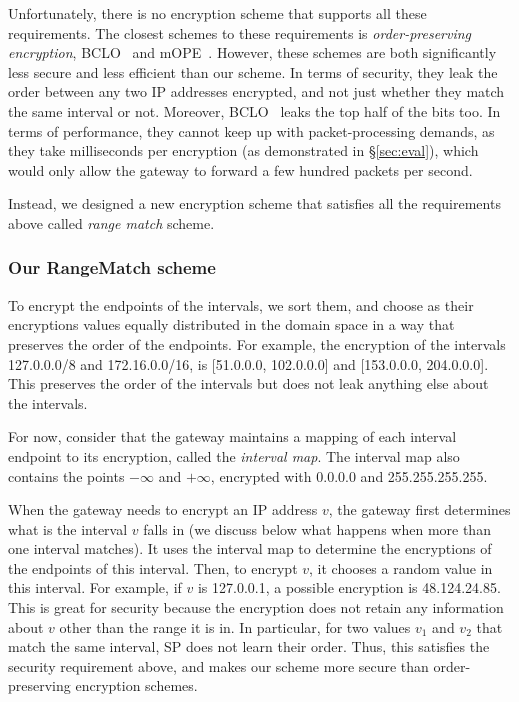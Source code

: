Unfortunately, there is no encryption scheme that supports all these requirements. The closest schemes to these requirements  is {\em order-preserving encryption}, BCLO~\cite{boldyreva:ope} and mOPE~\cite{popa:mope}. However, these schemes are both significantly less secure and less efficient than our scheme. In terms of security, they leak the order between any two IP addresses encrypted, and not just whether they match the same interval or not. Moreover, BCLO~\cite{boldyreva:ope} leaks the top half of the bits too. In terms of performance, they cannot keep up with packet-processing demands, as they take milliseconds per encryption (as demonstrated in \S\ref{sec:eval}), which would only allow the gateway to forward a few hundred packets per second. 


Instead, we designed a new encryption scheme that satisfies all the requirements above called {\em range match} scheme. 

\subsubsection{Our RangeMatch scheme} 




To encrypt the endpoints of the intervals, we sort them, and choose as their encryptions values equally distributed in the domain space in a way that preserves the order of the endpoints. For example, the encryption of the intervals 127.0.0.0/8 and 172.16.0.0/16, is [51.0.0.0, 102.0.0.0] and [153.0.0.0, 204.0.0.0]. This preserves the order of the intervals but does not leak anything else about the intervals.

For now, consider that the gateway  maintains a mapping of each interval endpoint  to its encryption, called the {\em interval map}.  The interval map also contains the points $- \infty$ and $+ \infty$, encrypted with 0.0.0.0 and 255.255.255.255. 


When the gateway needs to encrypt an IP address $v$, the gateway first determines what  is the interval  $v$ falls in (we discuss below what happens when more than one interval matches). It uses the interval map to determine the encryptions of the endpoints of this interval. Then, to encrypt $v$, it chooses a random value in this interval.
For example, if $v$ is 127.0.0.1, a possible encryption is 48.124.24.85. This is great for security because the encryption does not retain any information about $v$ other than the range it is in. In particular, for two values $v_1$ and $v_2$ that match the same interval, SP does not learn their order. Thus, this satisfies the security requirement above, and makes our scheme more secure than order-preserving encryption schemes.

